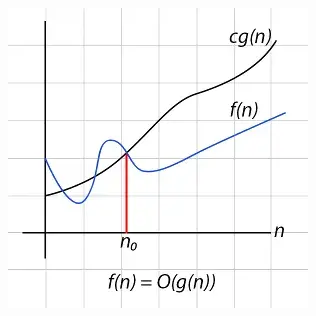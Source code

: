 \begin{frame}
\begin{columns}
    \begin{column}{0.3\textwidth}
      \includegraphics[width=\textwidth]{figures/MasterTheorem/big_o.jpg}
    \end{column}
  \end{columns}
\end{frame}

